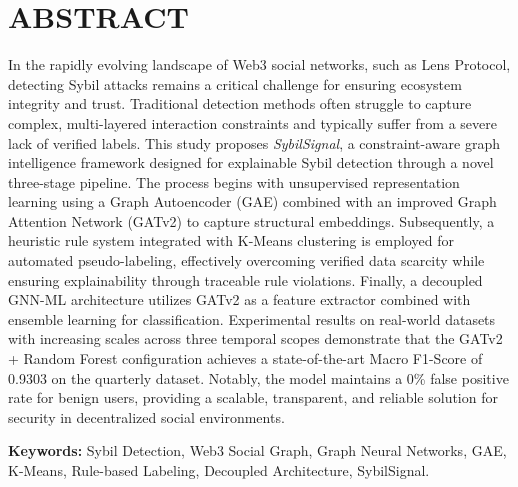 \chapter{ABSTRACT}

\indent\indent In the rapidly evolving landscape of Web3 social networks, such as Lens Protocol, detecting Sybil attacks remains a critical challenge for ensuring ecosystem integrity and trust. Traditional detection methods often struggle to capture complex, multi-layered interaction constraints and typically suffer from a severe lack of verified labels. This study proposes \textit{SybilSignal}, a constraint-aware graph intelligence framework designed for explainable Sybil detection through a novel three-stage pipeline. The process begins with unsupervised representation learning using a Graph Autoencoder (GAE) combined with an improved Graph Attention Network (GATv2) to capture structural embeddings. Subsequently, a heuristic rule system integrated with K-Means clustering is employed for automated pseudo-labeling, effectively overcoming verified data scarcity while ensuring explainability through traceable rule violations. Finally, a decoupled GNN-ML architecture utilizes GATv2 as a feature extractor combined with ensemble learning for classification. Experimental results on real-world datasets with increasing scales across three temporal scopes demonstrate that the GATv2 + Random Forest configuration achieves a state-of-the-art Macro F1-Score of 0.9303 on the quarterly dataset. Notably, the model maintains a 0\% false positive rate for benign users, providing a scalable, transparent, and reliable solution for security in decentralized social environments.\vspace{0.3cm}

\textbf{Keywords:} Sybil Detection, Web3 Social Graph, Graph Neural Networks, GAE, K-Means, Rule-based Labeling, Decoupled Architecture, SybilSignal.